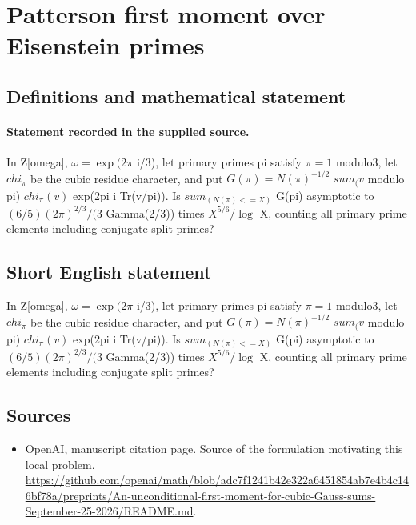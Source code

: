 \documentclass[11pt]{article}
\begin{document}
\section*{Patterson first moment over Eisenstein primes}\label{30007272}
\subsection{Definitions and mathematical statement}
\paragraph{Statement recorded in the supplied source.}
In Z[omega], $\omega =\exp (2\pi $ i/3), let primary primes pi satisfy $\pi =1$ modulo3, let $chi_\pi $ be the cubic residue character, and put $G(\pi )=N(\pi )^{-1/2}$ $sum_(v$ modulo pi) $chi_\pi (v)$ exp(2pi i Tr(v/pi)). Is $sum_(N(\pi )<=X)$ G(pi) asymptotic to $(6/5)(2\pi )^{2/3}/(3$ Gamma(2/3)) times $X^{5/6}/\log $ X, counting all primary prime elements including conjugate split primes?
\subsection{Short English statement}
In Z[omega], $\omega =\exp (2\pi $ i/3), let primary primes pi satisfy $\pi =1$ modulo3, let $chi_\pi $ be the cubic residue character, and put $G(\pi )=N(\pi )^{-1/2}$ $sum_(v$ modulo pi) $chi_\pi (v)$ exp(2pi i Tr(v/pi)). Is $sum_(N(\pi )<=X)$ G(pi) asymptotic to $(6/5)(2\pi )^{2/3}/(3$ Gamma(2/3)) times $X^{5/6}/\log $ X, counting all primary prime elements including conjugate split primes?
\subsection{Sources}
\begin{itemize}
\item[S1] OpenAI, manuscript citation page. Source of the formulation motivating this local problem.
\url{https://github.com/openai/math/blob/adc7f1241b42e322a6451854ab7e4b4c146bf78a/preprints/An-unconditional-first-moment-for-cubic-Gauss-sums-September-25-2026/README.md}.
\end{itemize}
\end{document}
